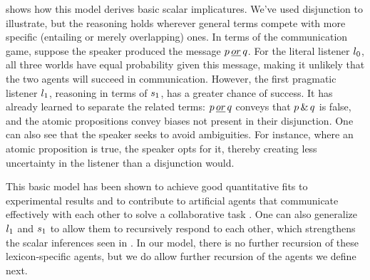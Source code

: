 \documentclass[12pt,twoside]{article}
\renewcommand{\_}{\textbf{\textunderscore\hspace{-4pt}\textunderscore\hspace{-3pt}\textunderscore\hspace{-4pt}\textunderscore}\hspace{0.5pt}}			%
\begin{document}
 shows how this model derives basic scalar
implicatures. We've used disjunction to illustrate, but the reasoning
holds wherever general terms compete with more specific (entailing or
merely overlapping) ones. In terms of the communication game, suppose
the speaker produced the message $p\,\emph{or}\,q$. For the literal listener
$l_{0}$, all three worlds have equal probability given this
message, making it unlikely that the two agents will succeed in
communication. However, the first pragmatic listener $l_{1}$,
reasoning in terms of $s_{1}$, has a greater chance of success.
It has already learned to separate the related terms: $p\,\emph{or}\,q$ conveys
that $p\,\&\,q$ is false, and the atomic propositions convey biases not
present in their disjunction. One can also see that the speaker seeks
to avoid ambiguities. For instance, where an atomic proposition is
true, the speaker opts for it, thereby creating less uncertainty in
the listener than a disjunction would.

This basic model has been shown to achieve good quantitative fits to
experimental results
\citep{Degen:Franke:2012,Stiller:Goodman:Frank:2011} and to contribute
to artificial agents that communicate effectively with each other to
solve a collaborative task \citep{Vogel-etal:2013}. One can also
generalize $l_{1}$ and $s_{1}$ to allow them to
recursively respond to each other, which strengthens the scalar
inferences seen in . In our model, there is no
further recursion of these lexicon-specific agents, but we do allow
further recursion of the agents we define next.
\end{document}
